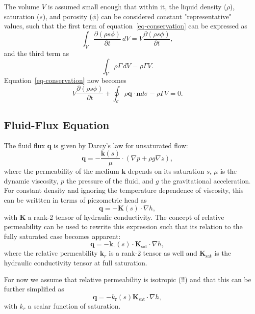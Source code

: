 \documentclass[fleqn]{article}
\begin{document}
The volume $V$ is assumed small enough that within it, the
liquid density ($\rho$), saturation ($s$), and porosity ($\phi$) can be
considered constant "representative" values, such that the first term of
equation~\ref{eq-conservation} can be expressed as
\begin{equation}
  \int_V \frac{\partial (\rho s \phi)}{\partial t} \,dV = 
  V \frac{\partial (\rho s \phi)}{\partial t},
\end{equation}
and the third term as
\begin{equation}
  \int_V \rho \Gamma \,dV = \rho \Gamma V.
\end{equation}
Equation~\ref{eq-conservation} now becomes
\begin{equation}
  V \frac{\partial (\rho s \phi)}{\partial t} +
  \oint_\sigma \rho \mathbf{q} \cdot \mathbf{n} d\sigma -
  \rho \Gamma V = 0.
\end{equation}

\subsection{Fluid-Flux Equation}
The fluid flux $\mathbf{q}$ is given by Darcy's law for unsaturated flow:
\begin{equation}
  \mathbf{q} = - \frac{\mathbf{k}(s)}{\mu} \cdot ( \nabla p + \rho g \nabla z ),
\end{equation}
where the permeability of the medium $\mathbf{k}$ depends on its saturation $s$,
$\mu$ is the dynamic viscosity, $p$ the pressure of the fluid, and $g$ the
gravitational acceleration. For constant density and ignoring the temperature
dependence of viscosity, this can be writtten in terms of piezometric head as
\begin{equation}
  \mathbf{q} = - \mathbf{K}(s) \cdot \nabla h,
\end{equation}
with $\mathbf{K}$ a rank-2 tensor of hydraulic conductivity. The concept of relative
permeability can be used to rewrite this expression such that its relation
to the fully saturated case becomes apparent:
\begin{equation}
  \mathbf{q} = - \mathbf{k}_\text{r}(s) \cdot
  \mathbf{K}_{\textrm{sat}} \cdot \nabla h,
\end{equation}
where the relative permeability $\mathbf{k}_r$ is a rank-2 tensor as well and
$\mathbf{K}_\text{sat}$ is the hydraulic conductivity tensor at full saturation.

For now we assume that relative permeability is isotropic (!!) and that this 
can be further simplified as
\begin{equation}
  \mathbf{q} = - k_\text{r}(s) \mathbf{K}_{\textrm{sat}} \cdot \nabla h,
\end{equation}
with $k_r$ a scalar function of saturation.
\end{document}
